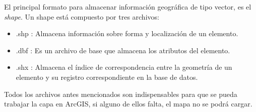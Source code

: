 El principal formato para almacenar información geográfica de tipo vector, es el \textit{shape}. Un shape está compuesto por tres archivos: 
\begin{itemize} 
    \item .shp : Almacena información sobre forma y localización de un elemento. 
    \item .dbf : Es un archivo de base que almacena los atributos del elemento. 
    \item .shx : Almacena el índice de correspondencia entre la geometría de un elemento y su registro correspondiente en la base de datos. 
\end{itemize}
Todos los archivos antes mencionados son indispensables para que se pueda trabajar la capa en ArcGIS, si alguno de ellos falta, el mapa no se podrá cargar.




























































%
%
%
%

